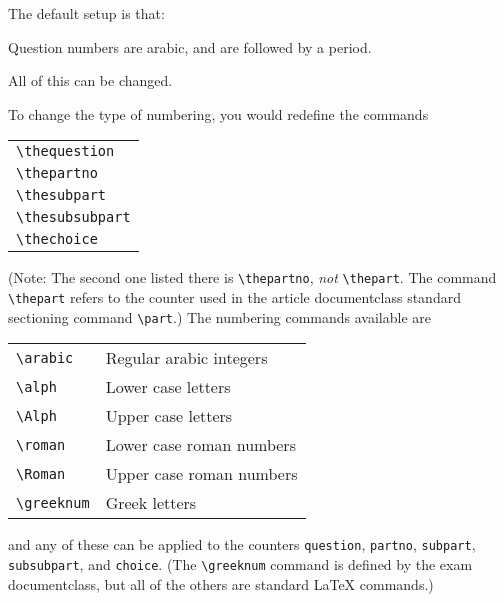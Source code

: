 \documentclass[12pt]{exam}
\begin{document}
The default setup is that:
\begin{questions}
  \question Question numbers are arabic, and are followed by a period.
\end{questions}
All of this can be changed.

\bigskip

To change the type of numbering, you would redefine the commands
\begin{center}
  \begin{tabular}{l}
    \verb"\thequestion"\\
    \verb"\thepartno"\\
    \verb"\thesubpart"\\
    \verb"\thesubsubpart"\\
    \verb"\thechoice"
  \end{tabular}
\end{center}
(Note: The second one listed there is \verb"\thepartno", \emph{not}
\verb"\thepart".  The command \verb"\thepart" refers to the counter
used in the article documentclass standard sectioning command
\verb"\part".)  The numbering commands available are
\begin{center}
  \begin{tabular}{ll}
    \verb"\arabic"& Regular arabic integers\\
    \verb"\alph"& Lower case letters\\
    \verb"\Alph"& Upper case letters\\
    \verb"\roman"& Lower case roman numbers\\
    \verb"\Roman"& Upper case roman numbers\\
    \verb"\greeknum"& Greek letters
  \end{tabular}
\end{center}
and any of these can be applied to the counters \verb"question",
\verb"partno", \verb"subpart", \verb"subsubpart", and \verb"choice".
(The \verb"\greeknum" command is defined by the exam documentclass,
but all of the others are standard \LaTeX{} commands.)
\end{document}
